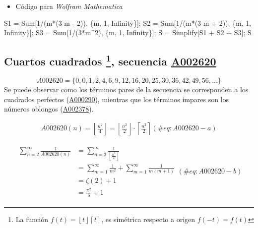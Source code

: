 \documentclass[
  letterpaper,
  DIV=11,
  numbers=noendperiod]{scrreprt}
\newenvironment{Shaded}{\begin{snugshade}}{\end{snugshade}}
\newcommand{\NormalTok}[1]{\textcolor[rgb]{0.00,0.23,0.31}{#1}}
\providecommand{\tightlist}{%
  \setlength{\itemsep}{0pt}\setlength{\parskip}{0pt}}\usepackage{longtable,booktabs,array}
\begin{document}
\begin{itemize}
\tightlist
\item
  Código para \emph{Wolfram Mathematica}
\end{itemize}

\begin{Shaded}
\begin{Highlighting}[]
\NormalTok{    S1 = Sum[1/(m*(3 m {-} 2)), \{m, 1, Infinity\}];}
\NormalTok{    S2 = Sum[1/(m*(3 m + 2)), \{m, 1, Infinity\}];}
\NormalTok{    S3 = Sum[1/(3*m\^{}2), \{m, 1, Infinity\}];}
\NormalTok{    S = Simplify[S1 + S2 + S3];}
\NormalTok{    S}
\end{Highlighting}
\end{Shaded}

\hypertarget{cuartos-cuadrados-index-1-secuencia-a002620}{%
\subsection[Cuartos cuadrados , secuencia
\href{https://oeis.org/A002620}{A002620}]{\texorpdfstring{Cuartos
cuadrados \footnote{La función
  \(f(t) = \left\lfloor t \right\rfloor \left\lceil  t \right\rceil\),
  es simétrica respecto a origen \(f(-t)=f(t)\)}, secuencia
\href{https://oeis.org/A002620}{A002620}}{Cuartos cuadrados , secuencia A002620}}\label{cuartos-cuadrados-index-1-secuencia-a002620}}

\[A002620 = \{0, 0, 1, 2, 4, 6, 9, 12, 16, 20, 25, 30, 36, 42, 49, 56,...\}\]
Se puede observar como los términos pares de la secuencia se
corresponden a los cuadrados perfectos
(\href{https://oeis.org/A000290}{A000290}), mientras que los términos
impares son los números oblongos
(\href{https://oeis.org/A002378}{A002378}).

\begin{multline}
A002620(n) = \left\lfloor \frac{n^2}{4} \right\rfloor = 
\left\lfloor \frac{n^2}{2} \right\rfloor \cdot \left\lceil \frac{n^2}{2} \right\rceil
  (\#eq:A002620-a)
\end{multline}

\begin{multline}
\!\begin{aligned}
\sum_{n=2}^{\infty}{\frac{1}{A002620(n)}} & = \sum_{n=2}^{\infty}{\frac{1}{ \left\lfloor\frac{n^2}{4}\right\rfloor}} \\
& = \sum_{m=1}^{\infty}{\frac{1}{m^2}} + \sum_{m=1}^{\infty}{\frac{1}{m(m+1)}} \\
& = \zeta(2) + 1 \\
& = \frac{\pi^2}{6} + 1
\end{aligned}
(\#eq:A002620-b)
\end{multline}
\end{document}
